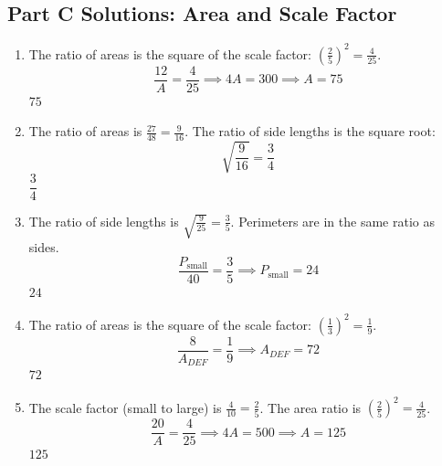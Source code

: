 \documentclass[14pt]{extarticle}
\begin{document}
\subsection*{Part C Solutions: Area and Scale Factor}
\begin{enumerate}
  \item The ratio of areas is the square of the scale factor: \(\left(\frac{2}{5}\right)^2 = \frac{4}{25}\).
  \[
  \frac{12}{A} = \frac{4}{25} \implies 4A = 300 \implies A = 75
  \]
  \(\boxed{75}\)

  \item The ratio of areas is \(\frac{27}{48} = \frac{9}{16}\). The ratio of side lengths is the square root:
  \[
  \sqrt{\frac{9}{16}} = \frac{3}{4}
  \]
  \(\boxed{\dfrac{3}{4}}\)

  \item The ratio of side lengths is \(\sqrt{\frac{9}{25}} = \frac{3}{5}\). Perimeters are in the same ratio as sides.
  \[
  \frac{P_{\text{small}}}{40} = \frac{3}{5} \implies P_{\text{small}} = 24
  \]
  \(\boxed{24}\)

  \item The ratio of areas is the square of the scale factor: \(\left(\frac{1}{3}\right)^2 = \frac{1}{9}\).
  \[
  \frac{8}{A_{DEF}} = \frac{1}{9} \implies A_{DEF} = 72
  \]
  \(\boxed{72}\)

  \item The scale factor (small to large) is \(\frac{4}{10} = \frac{2}{5}\). The area ratio is \(\left(\frac{2}{5}\right)^2 = \frac{4}{25}\).
  \[
  \frac{20}{A} = \frac{4}{25} \implies 4A = 500 \implies A = 125
  \]
  \(\boxed{125}\)
\end{enumerate}
\end{document}
